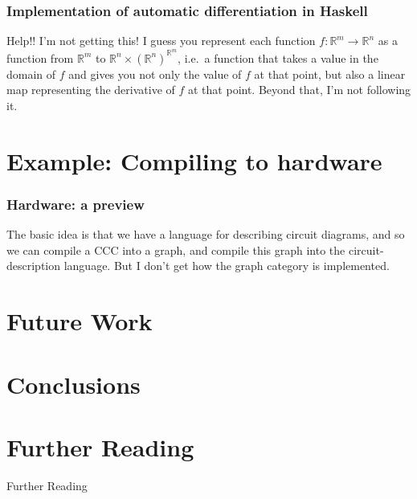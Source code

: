 \documentclass[10pt]{beamer}
\theoremstyle{definition}
\theoremstyle{remark}
\numberwithin{equation}{section}
\begin{document}
\begin{frame}[fragile]
  \frametitle{Implementation of automatic differentiation in Haskell}

  Help!! I'm not getting this! I guess you represent each function $f\colon
  \mathbb{R}^m \rightarrow \mathbb{R}^n$ as a function from $\mathbb{R}^m$ to
  $\mathbb{R}^n \times {\left(\mathbb{R}^n\right)}^{\mathbb{R}^m}$, i.e.\ a function
  that takes a value in the domain of $f$ and gives you not only the value of
  $f$ at that point, but also a linear map representing the derivative of $f$ at
  that point. Beyond that, I'm not following it.
\end{frame}

\section{Example: Compiling to hardware}

\begin{frame}[fragile]
  \frametitle{Hardware: a preview}

  The basic idea is that we have a language for describing circuit diagrams, and
  so we can compile a CCC into a graph, and compile this graph into the
  circuit-description language. But I don't get how the graph category is
  implemented.
  
\end{frame}

\section{Future Work} %

\section{Conclusions} %

\section{Further Reading}

\begin{frame}[fragile]{Further Reading}

  \nocite{elkins_calculating_2009}
  \nocite{diel:blog}
  \nocite{milewski2014}

  
  

\end{frame}
\end{document}
